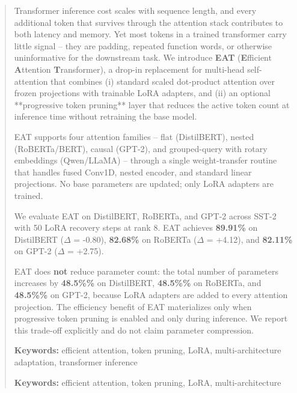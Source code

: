 \documentclass[10pt,twocolumn,letterpaper]{article}
\begin{document}
\maketitle

\begin{abstract}
Transformer inference cost scales with sequence length, and every additional 
token that survives through the attention stack contributes to both latency 
and memory. Yet most tokens in a trained transformer carry little signal -- 
they are padding, repeated function words, or otherwise uninformative for 
the downstream task. We introduce \textbf{EAT} (\textbf{E}fficient \textbf{A}ttention 
\textbf{T}ransformer), a drop-in replacement for multi-head self-attention that 
combines (i) standard scaled dot-product attention over frozen projections 
with trainable LoRA adapters, and (ii) an optional **progressive token 
pruning** layer that reduces the active token count at inference time without 
retraining the base model.

EAT supports four attention families -- flat (DistilBERT), nested 
(RoBERTa/BERT), causal (GPT-2), and grouped-query with rotary embeddings 
(Qwen/LLaMA) -- through a single weight-transfer routine that handles fused 
Conv1D, nested encoder, and standard linear projections. No base parameters 
are updated; only LoRA adapters are trained.

We evaluate EAT on DistilBERT, RoBERTa, and GPT-2 across SST-2 with 
50 LoRA recovery steps at rank 8. EAT achieves 
\textbf{89.91\%} on DistilBERT ($\Delta$ = -0.80), \textbf{82.68\%} on RoBERTa 
($\Delta$ = +4.12), and \textbf{82.11\%} on GPT-2 ($\Delta$ = +2.75). 

EAT does \textbf{not} reduce parameter count: the total number of parameters 
increases by \textbf{48.5\%\%} on DistilBERT, \textbf{48.5\%\%} 
on RoBERTa, and \textbf{48.5\%\%} on GPT-2, because LoRA adapters 
are added to every attention projection. The efficiency benefit of EAT 
materializes only when progressive token pruning is enabled and only during 
inference. We report this trade-off explicitly and do not claim parameter 
compression.

\textbf{Keywords:} efficient attention, token pruning, LoRA, multi-architecture 
adaptation, transformer inference



\vspace{0.5em}
\noindent\textbf{Keywords:} efficient attention, token pruning, LoRA, multi-architecture
\end{abstract}
\end{document}
